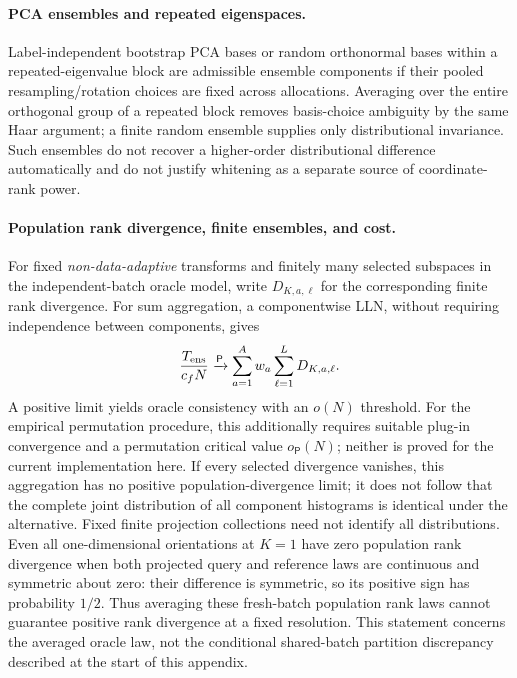 {\paragraph{PCA ensembles and repeated eigenspaces.}
Label-independent bootstrap PCA bases or random orthonormal bases within a repeated-eigenvalue block are admissible ensemble components if their pooled resampling/rotation choices are fixed across allocations. Averaging over the entire orthogonal group of a repeated block removes basis-choice ambiguity by the same Haar argument; a finite random ensemble supplies only distributional invariance. Such ensembles do not recover a higher-order distributional difference automatically and do not justify whitening as a separate source of coordinate-rank power.

\paragraph{Population rank divergence, finite ensembles, and cost.}
For fixed \emph{non-data-adaptive} transforms and finitely many selected subspaces in the independent-batch oracle model, write $D_{K,a,\ell}$ for the corresponding finite rank divergence. For sum aggregation, a componentwise LLN, without requiring independence between components, gives
\[
\frac{T_{\rm ens}}{c_fN}\xrightarrow{\mathsf P}
\sum_{a=1}^A w_a\sum_{\ell=1}^L D_{K,a,\ell}.
\]
A positive limit yields oracle consistency with an $o(N)$ threshold. For the empirical permutation procedure, this additionally requires suitable plug-in convergence and a permutation critical value $o_{\mathsf P}(N)$; neither is proved for the current implementation here. If every selected divergence vanishes, this aggregation has no positive population-divergence limit; it does not follow that the complete joint distribution of all component histograms is identical under the alternative. Fixed finite projection collections need not identify all distributions. Even all one-dimensional orientations at $K=1$ have zero population rank divergence when both projected query and reference laws are continuous and symmetric about zero: their difference is symmetric, so its positive sign has probability $1/2$. Thus averaging these fresh-batch population rank laws cannot guarantee positive rank divergence at a fixed resolution. This statement concerns the averaged oracle law, not the conditional shared-batch partition discrepancy described at the start of this appendix.

}
